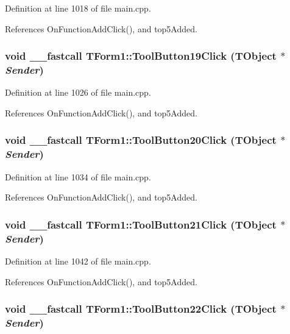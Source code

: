 Definition at line 1018 of file main.cpp.

References OnFunctionAddClick(), and top5Added.\hypertarget{classTForm1_b8f8eeee515fd162462380c9a0eb450e}{
\subsubsection[ToolButton19Click]{\setlength{\rightskip}{0pt plus 5cm}void \_\-\_\-fastcall TForm1::ToolButton19Click (TObject $\ast$ {\em Sender})}}
\label{classTForm1_b8f8eeee515fd162462380c9a0eb450e}




Definition at line 1026 of file main.cpp.

References OnFunctionAddClick(), and top5Added.\hypertarget{classTForm1_ed5b7aeb13679cc44c7fa9fd3f3a0eff}{
\subsubsection[ToolButton20Click]{\setlength{\rightskip}{0pt plus 5cm}void \_\-\_\-fastcall TForm1::ToolButton20Click (TObject $\ast$ {\em Sender})}}
\label{classTForm1_ed5b7aeb13679cc44c7fa9fd3f3a0eff}




Definition at line 1034 of file main.cpp.

References OnFunctionAddClick(), and top5Added.\hypertarget{classTForm1_b91cedf9d878aadab926009fdd6880fe}{
\subsubsection[ToolButton21Click]{\setlength{\rightskip}{0pt plus 5cm}void \_\-\_\-fastcall TForm1::ToolButton21Click (TObject $\ast$ {\em Sender})}}
\label{classTForm1_b91cedf9d878aadab926009fdd6880fe}




Definition at line 1042 of file main.cpp.

References OnFunctionAddClick(), and top5Added.\hypertarget{classTForm1_378f04e87d819886bcb3e20aa47ab90a}{
\subsubsection[ToolButton22Click]{\setlength{\rightskip}{0pt plus 5cm}void \_\-\_\-fastcall TForm1::ToolButton22Click (TObject $\ast$ {\em Sender})}}
\label{classTForm1_378f04e87d819886bcb3e20aa47ab90a}




